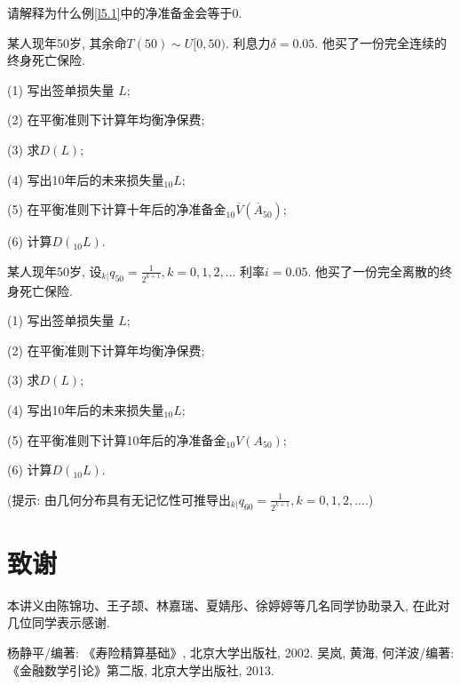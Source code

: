 \documentclass[a4paper,openany, 10pt]{ctexbook}
\begin{document}
\begin{exs} 请解释为什么例\ref{l5.1}中的净准备金会等于0.
\end{exs}
\begin{exs}
  某人现年50岁, 其余命$T(50)\sim U[0,50).$ 利息力$\delta=0.05.$ 他买了一份完全连续的终身死亡保险.

  (1) 写出签单损失量 $L;$

  (2) 在平衡准则下计算年均衡净保费;

  (3) 求$D(L);$

  (4) 写出10年后的未来损失量$_{10}L;$

  (5) 在平衡准则下计算十年后的净准备金${}_{10}\overline V(\overline A_{50});$

  (6) 计算$D({}_{10}L).$
\end{exs}

\begin{exs}
  某人现年50岁, 设${}_{k|}q_{50}=\frac{1}{2^{k+1}},k=0,1,2,...$ 利率$i=0.05.$ 他买了一份完全离散的终身死亡保险.

  (1) 写出签单损失量 $L;$

  (2) 在平衡准则下计算年均衡净保费;

  (3) 求$D(L);$

  (4) 写出10年后的未来损失量$_{10}L;$

  (5) 在平衡准则下计算10年后的净准备金${}_{10}V( A_{50});$

  (6) 计算$D({}_{10}L).$

  (提示: 由几何分布具有无记忆性可推导出${}_{k|}q_{60}=\frac{1}{2^{k+1}},k=0,1,2,....$)
\end{exs}

\backmatter

\chapter{致谢}

本讲义由陈锦功、王子颉、林嘉瑞、夏婧彤、徐婷婷等几名同学协助录入, 在此对几位同学表示感谢.

\newpage
{}
\begin{thebibliography}{99}
    杨静平/编著: 《寿险精算基础》, 北京大学出版社, 2002.
     吴岚, 黄海, 何洋波/编著: 《金融数学引论》第二版, 北京大学出版社, 2013.

\end{thebibliography}
\end{document}
